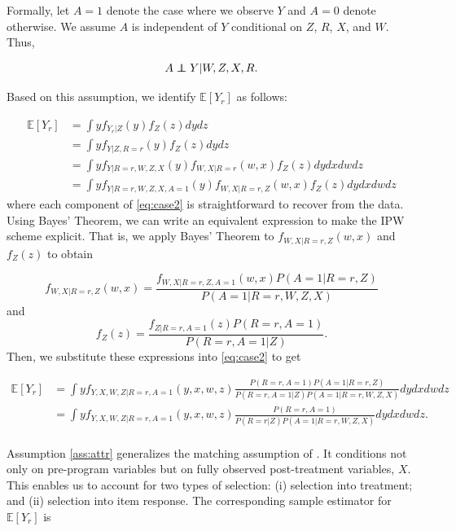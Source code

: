\begin{appendices}
\noindent Formally, let $A=1$ denote the case where we observe $Y$ and $A=0$ denote otherwise. We assume $A$ is independent of $Y$ conditional on $Z$, $R$, $X$, and $W$. Thus,

\begin{assumption} \label{ass:attr}
	\begin{align*}
		A \independent Y | W, Z, X, R.
	\end{align*}
\end{assumption}

\noindent Based on this assumption, we identify $\mathbb{E}[Y_r]$ as follows:

\begin{align} \label{eq:case2}
\mathbb{E}[Y_r] & = \int y f_{Y_r|Z}(y) f_Z(z) dydz \\ \nonumber
	           & = \int y f_{Y|Z,R=r}(y) f_Z(z) dydz \\ \nonumber
				& = \int y f_{Y|R=r,W,Z,X}(y) f_{W,X|R=r}(w,x) f_Z(z) dydxdwdz \\ \nonumber
				& = \int y f_{Y|R=r,W,Z,X,A=1}(y) f_{W,X|R=r,Z}(w,x) f_Z(z) dydxdwdz
\end{align}
\noindent where each component of \eqref{eq:case2} is straightforward to recover from the data. Using Bayes' Theorem, we can write an equivalent expression to make the IPW scheme explicit. That is, we apply Bayes' Theorem to $f_{W,X|R=r,Z}(w,x)$ and $f_Z(z)$ to obtain

\begin{equation*}
f_{W,X|R=r,Z}(w,x) = \frac{f_{W,X|R=r,Z,A=1}(w,x) P(A=1|R=r,Z)}{P(A=1|R=r,W,Z,X)}
\end{equation*}
and
\begin{equation*}
	f_Z(z) = \frac{f_{Z|R=r,A=1}(z) P(R=r,A=1)}{P(R=r,A=1|Z)}.
\end{equation*}
\noindent Then, we substitute these expressions into \eqref{eq:case2} to get

\begin{align*} \label{eq:case2ipw}
\mathbb{E}[Y_r] & = \int y f_{Y,X,W,Z|R=r,A=1}(y,x,w,z) \frac{P(R=r,A=1) P(A=1|R=r,Z)}{P(R=r,A=1|Z) P(A=1|R=r,W,Z,X)} dydxdwdz \\
	            & = \int y f_{Y,X,W,Z|R=r,A=1}(y,x,w,z) \frac{P(R=r,A=1)}{P(R=r|Z) P(A=1|R=r,W,Z,X)} dydxdwdz. \\
\end{align*}

\noindent Assumption \ref{ass:attr} generalizes the matching assumption of \citet{Campbell_Conti_etal_2014_EarlyChildhoodInvestments}. It conditions not only on pre-program variables but on fully observed post-treatment variables, $X$. This enables us to account  for two types of selection:  (i) selection into treatment; and (ii) selection into item response. The corresponding sample estimator for $\mathbb{E}[Y_r]$ is


\end{appendices}
